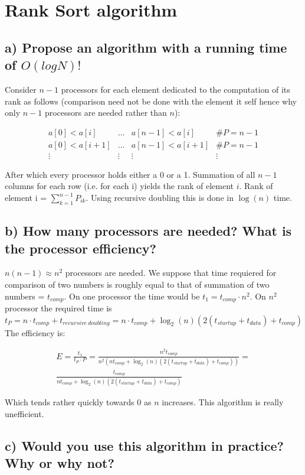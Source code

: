 \section{Rank Sort algorithm}
\subsection*{a) Propose an algorithm with a running time of $O(log N)!$}
Consider $n-1$ processors for each element dedicated to the computation of its rank as follows (comparison need not be done with the element it self hence why only $n-1$ processors are needed rather than $n$):

\[
\begin{array}{cccc}
a[0]< a[i] & \dots  & a[n-1]< a[i] & \# P = n-1  \\ 
a[0]< a[i+1] & \dots  & a[n-1]< a[i+1] & \#P = n-1 \\ 
\vdots  & \vdots  & \vdots  & \vdots 
\end{array}
\]

After which every processor holds either a 0 or a 1. Summation of all $n-1$ columns for each row (i.e. for each i) yields the rank of element $i$. Rank of element i = $\sum_{k=1}^{n-1} P_{ik}$. Using recursive doubling this is done in $\log(n)$ time.

\subsection*{b) How many processors are needed? What is the processor efficiency?}
$n(n-1) \approx n^2$ processors are needed. We suppose that time requiered for comparison of two numbers is roughly equal to that of summation of two numbers = $t_{comp}$.  On one processor the time would be $t_1 = t_{comp}\cdot n^2$. On $n^2$ processor the required time is $t_P = n\cdot t_{comp} + t_{recursive\ doubling} =  n\cdot t_{comp} +\log_2(n)(2(t_{startup}+t_{data})+t_{comp}) $ The efficiency is:

\begin{gather*}
E = \frac{t_1}{t_P\cdot P} = \frac{n^2t_{comp}}{ n^2(nt_{comp}+ \log_2(n)(2(t_{startup}+t_{data})+t_{comp}))} =\\ \frac{t_{comp}}{nt_{comp}+ \log_2(n)(2(t_{startup}+t_{data})+t_{comp})}
\end{gather*}

Which tends rather quickly towards 0 as $n$ increases. This algorithm is really unefficient.

\subsection*{c) Would you use this algorithm in practice? Why or why not?}

